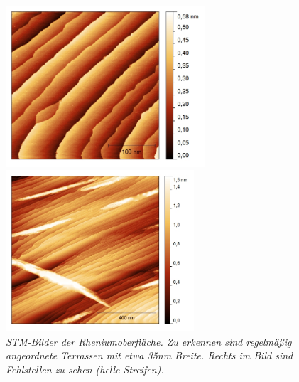 \begin{figure}[htbp]
	\begin{minipage}[b]{0.5\textwidth} 
		\includegraphics[height=6cm]{rekristall1.jpg}
	\end{minipage}
	\hfill
	\begin{minipage}[b]{0.5\textwidth}
		\includegraphics[height=6cm]{rekristall2.jpg}
	\end{minipage}
	\caption{\textit{STM-Bilder der Rheniumoberfläche. Zu erkennen sind regelmäßig angeordnete
	Terrassen mit etwa 35nm Breite. Rechts im Bild sind Fehlstellen zu sehen (helle Streifen).}}
	\label{rekristallstm} 


\end{figure}
